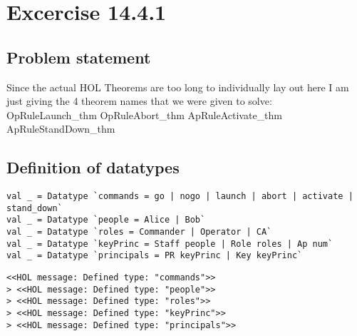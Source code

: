 \documentclass{report}
\begin{document}
\chapter{Excercise 14.4.1}
\label{cha:14-4-1}

\section{Problem statement}
\label{problem-statement-14-4-1}
Since the actual HOL Theorems are too long to individually lay out
here I am just giving the 4 theorem names that we were given to solve:
OpRuleLaunch_thm
OpRuleAbort_thm
ApRuleActivate_thm
ApRuleStandDown_thm

\section{Definition of datatypes}
\label{def-14-4-1}
\begin{lstlisting}[frame=TBlr]
val _ = Datatype `commands = go | nogo | launch | abort | activate | stand_down`
val _ = Datatype `people = Alice | Bob`
val _ = Datatype `roles = Commander | Operator | CA`
val _ = Datatype `keyPrinc = Staff people | Role roles | Ap num`
val _ = Datatype `principals = PR keyPrinc | Key keyPrinc`
\end{lstlisting}
\begin{session}
  \begin{scriptsize}
\begin{verbatim}
<<HOL message: Defined type: "commands">>
> <<HOL message: Defined type: "people">>
> <<HOL message: Defined type: "roles">>
> <<HOL message: Defined type: "keyPrinc">>
> <<HOL message: Defined type: "principals">>
\end{verbatim}
  \end{scriptsize}
\end{session}
\end{document}
